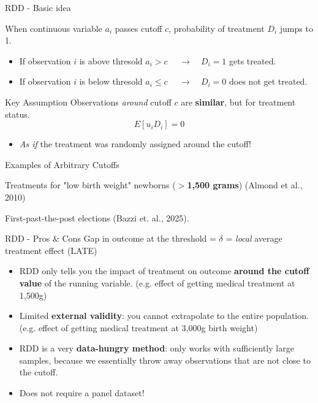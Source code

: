 \documentclass[11pt, aspectratio = 169]{beamer}
\begin{document}
\begin{frame}{RDD - Basic idea}

When continuous variable $a_i$ passes cutoff $c$, probability of treatment $D_{i}$ jumps to 1.
		\begin{itemize}
				\item If observation $i$ is above thresold $a_{i} > c$ $\quad \rightarrow \quad D_i =1$ gets treated.
				\item If observation $i$ is below thresold $a_{i} \leq c$ $\quad \rightarrow \quad D_i =0$ does not get treated.
		\end{itemize}
		\pause
		\begin{block}{Key Assumption}
			\vspace{0.2cm}
			Observations \textit{around} cutoff $c$ are \textbf{similar}, but for treatment status.
			$$
			E[u_{i} D_i] = 0
			$$
			\vspace{-1cm}
			\begin{itemize}
			\item[$\rightarrow$] \textit{As if} the treatment was randomly assigned around the cutoff! 
			\end{itemize}
		\end{block}
		\pause 
		\begin{block}{Examples of Arbitrary Cutoffs}
			\begin{itemize} \footnotesize{
				\item Treatments for "low birth weight" newborns (\textbf{$>$1,500 grams}) \footnotesize{(Almond et al., 2010)}
				\item First-past-the-post elections (Bazzi et. al., 2025).}
			\end{itemize}
		\end{block}
\end{frame}

\begin{frame}{RDD - Pros \& Cons}
				Gap in outcome at the threshold  = $\delta$ = \textit{local} average treatment effect (LATE)
				\medskip 
		\pause
		\begin{itemize}
			\item RDD only tells you the impact of treatment on outcome \textbf{around the cutoff value} of the running variable. \color{gray}(e.g. effect of getting medical treatment at 1,500g) \color{black}
			\item	Limited \textbf{external validity}: you cannot extrapolate to the entire population. \color{gray}(e.g. effect of getting medical treatment at 3,000g birth weight) \color{black}
			\item	RDD is a very \textbf{data-hungry method}: only works with sufficiently large samples, because we essentially throw away observations that are not close to the cutoff.	
			\pause
			\item[$\rightarrow$] Does not require a panel dataset! 
		\end{itemize}
\end{frame}
\end{document}

